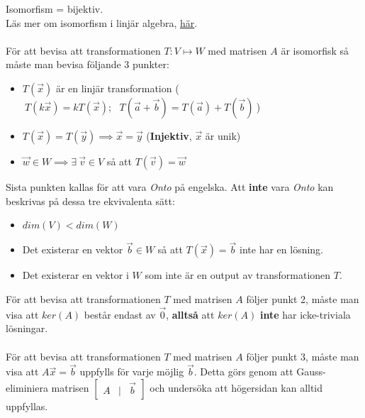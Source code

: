 \documentclass{report}
\begin{document}
{
	Isomorfism = bijektiv.\\
	Läs mer om isomorfism i linjär algebra, \href{https://math.libretexts.org/Bookshelves/Linear_Algebra/A_First_Course_in_Linear_Algebra_(Kuttler)/05\%3A_Linear_Transformations/5.06\%3A_Isomorphisms}{här}.
	\\\\
	
	För att bevisa att transformationen $T: V \mapsto W$ med matrisen $A$ är isomorfisk så måste man bevisa följande 3 punkter:
	\begin{itemize}
		\item $T(\vec{x})$ är en linjär transformation ($\:T(k\vec{x}) = kT(\vec{x}); \:\:\: T(\vec{a} + \vec{b}) = T(\vec{a}) + T(\vec{b})\:$)
		\item $T(\vec{x}) = T(\vec{y}) \implies \vec{x} = \vec{y}$ (\textbf{Injektiv}, $\vec{x}$ är unik)
		\item $\vec{w} \in W \implies \exists \: \vec{v} \in V$ så att $T(\vec{v}) = \vec{w}$
	\end{itemize}
	Sista punkten kallas för att vara \textit{Onto} på engelska. Att \textbf{inte} vara \textit{Onto} kan beskrivas på dessa tre ekvivalenta sätt:
	\begin{itemize}
		\item $dim(V) < dim(W)$
		\item Det existerar en vektor $\vec{b} \in W$ så att $T(\vec{x}) = \vec{b}$ inte har en lösning.
		\item Det existerar en vektor i $W$ som inte är en output av transformationen $T$. 
	\end{itemize}
	För att bevisa att transformationen $T$ med matrisen $A$ följer punkt 2, måste man visa att $ker(A)$ består endast av $\vec{0}$, \textbf{alltså} att $ker(A)$ \textbf{inte} har icke-triviala lösningar.\\\\
	
	För att bevisa att transformationen $T$ med matrisen $A$ följer punkt 3, måste man visa att $A\vec{x} = \vec{b}$ uppfylls för varje möjlig $\vec{b}$. Detta görs genom att Gauss-eliminiera matrisen $
\begin{bmatrix}
	A & | & \vec{b}
\end{bmatrix}	
$ och undersöka att högersidan kan alltid uppfyllas. 
}

\pagebreak
\end{document}

